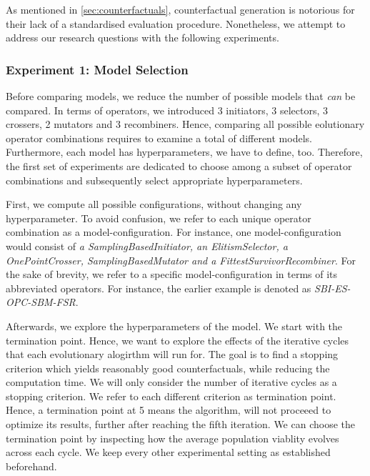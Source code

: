 \documentclass[./../../paper.tex]{subfiles}
\begin{document}
As mentioned in \autoref{sec:counterfactuals}, counterfactual generation is notorious for their lack of a standardised evaluation procedure. Nonetheless, we attempt to address our research questions with the following experiments.

\subsubsection{Experiment 1: Model Selection}
Before comparing models, we reduce the number of possible models that \emph{can} be compared. In terms of operators, we introduced 3 initiators, 3 selectors, 3 crossers, 2 mutators and 3 recombiners. Hence, comparing all possible eolutionary operator combinations requires to examine a total of \NumEvoCombinations different models. Furthermore, each model has hyperparameters, we have to define, too. Therefore, the first set of experiments are dedicated to choose among a subset of operator combinations and subsequently select appropriate hyperparameters. 

First, we compute all possible configurations, without changing any hyperparameter. To avoid confusion, we refer to each unique operator combination as a model-configuration. For instance, one model-configuration would consist of \emph{a SamplingBasedInitiator, an ElitismSelector, a OnePointCrosser, SamplingBasedMutator and a FittestSurvivorRecombiner}. For the sake of brevity, we refer to a specific model-configuration in terms of its abbreviated operators. For instance, the earlier example is denoted as \emph{SBI-ES-OPC-SBM-FSR}.

Afterwards, we explore the hyperparameters of the model. We start with the termination point. Hence, we want to explore the effects of the iterative cycles that each evolutionary alogirthm will run for. The goal is to find a stopping criterion which yields reasonably good counterfactuals, while reducing the computation time. We will only consider the number of iterative cycles as a stopping criterion. We refer to each different criterion as termination point. Hence, a termination point at 5 means the algorithm, will not proceeed to optimize its results, further after reaching the fifth iteration. We can choose the termination point by inspecting how the average population viablity evolves across each cycle. We keep every other experimental setting as established beforehand.
\end{document}
